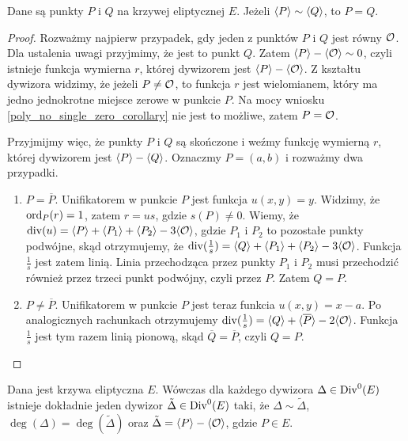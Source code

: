 \begin{lemma}\label{sim_pq_eq_pq_lemma}
Dane są punkty $P$ i $Q$ na krzywej eliptycznej $E$.
Jeżeli $\langle P\rangle \sim \langle Q\rangle$,
to $P = Q$.
\end{lemma}

\begin{proof}
Rozważmy najpierw przypadek,
gdy jeden z punktów $P$ i $Q$ jest równy $\mathcal{O}$.
Dla ustalenia uwagi przyjmimy, że jest to punkt $Q$.
Zatem $\langle P\rangle - \langle\mathcal{O}\rangle \sim 0$,
czyli istnieje funkcja wymierna $r$,
której dywizorem jest $\langle P\rangle - \langle\mathcal{O}\rangle$.
Z kształtu dywizora widzimy, że jeżeli $P \neq \mathcal{O}$, to funkcja $r$
jest wielomianem, który ma jedno jednokrotne miejsce zerowe w punkcie $P$.
Na mocy wniosku \ref{poly_no_single_zero_corollary} nie jest to możliwe,
zatem $P = \mathcal{O}$.

Przyjmijmy więc, że punkty $P$ i $Q$ są skończone
i weźmy funkcję wymierną $r$, której dywizorem jest $\langle P\rangle - \langle Q\rangle$.
Oznaczmy $P = (a, b)$ i rozważmy dwa przypadki.
\begin{enumerate}
\item $P = \overline{P}$.
Unifikatorem w punkcie $P$ jest funkcja $u(x, y) = y$.
Widzimy, że $\operatorname{ord}_P(r) = 1$, zatem $r = us$, gdzie $s(P) \neq 0$.
Wiemy, że $\operatorname{div}(u) = \langle P\rangle + \langle P_1\rangle + \langle P_2\rangle - 3\langle\mathcal{O}\rangle$,
gdzie $P_1$ i $P_2$ to pozostałe punkty podwójne,
skąd otrzymujemy, że
$\operatorname{div}(\frac{1}{s}) = \langle Q\rangle + \langle P_1\rangle + \langle P_2\rangle - 3\langle\mathcal{O}\rangle$.
Funkcja $\frac{1}{s}$ jest zatem linią.
Linia przechodząca przez punkty $P_1$ i $P_2$ musi przechodzić również przez
trzeci punkt podwójny, czyli przez $P$. Zatem $Q = P$.
\item $P \neq \overline{P}$.
Unifikatorem w punkcie $P$ jest teraz funkcia $u(x, y) = x - a$.
Po analogicznych rachunkach otrzymujemy
$\operatorname{div}(\frac{1}{s}) = \langle Q\rangle + \langle\overline{P}\rangle - 2\langle\mathcal{O}\rangle$.
Funkcja $\frac{1}{s}$ jest tym razem linią pionową,
skąd $\overline{Q} = \overline{P}$, czyli $Q = P$.
\end{enumerate}
\end{proof}

\begin{theorem}\label{zerodeg_divisor_linear_reduction_theorem}
Dana jest krzywa eliptyczna $E$.
Wówczas dla każdego dywizora $\Delta \in \operatorname{Div}^0(E)$
istnieje dokładnie jeden dywizor $\tilde{\Delta} \in \operatorname{Div}^0(E)$ taki,
że $\Delta \sim \tilde{\Delta}$, $\deg(\Delta) = \deg(\tilde{\Delta})$
oraz $\tilde{\Delta} = \langle P\rangle - \langle\mathcal{O}\rangle$,
gdzie $P \in E$.
\end{theorem}

